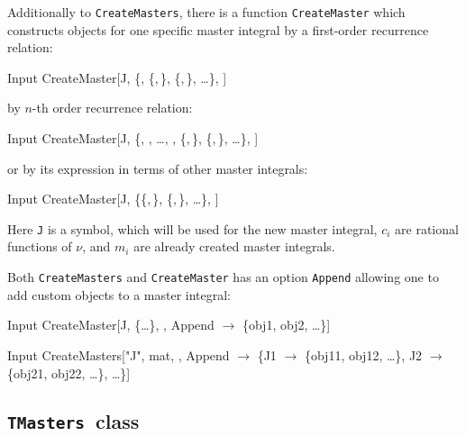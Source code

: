 \documentclass[sort&compress]{elsarticle}
\newcommand{\TMasters}{\texttt{TMasters}}
\begin{document}
Additionally to \texttt{CreateMasters}, there is a function \texttt{CreateMaster} which constructs objects for one specific master integral by a first-order recurrence relation:
\begin{mmaCell}[moredefined={CreateMaster}]{Input}
	CreateMaster[J, \{, \{,\,\}, \{,\,\}, \ldots\}, \mmaUnd{\(\nu\)}]
\end{mmaCell}
by $n$-th order recurrence relation:
\begin{mmaCell}[moredefined={CreateMaster,n}]{Input}
	CreateMaster[J, \{, , \ldots, , \{,\,\}, \{,\,\}, \ldots\}, \mmaUnd{\(\nu\)}]
\end{mmaCell}
or by its expression in terms of other master integrals:
\begin{mmaCell}[moredefined={CreateMaster}]{Input}
	CreateMaster[J, \{\{,\,\}, \{,\,\}, \ldots\}, \mmaUnd{\(\nu\)}]
\end{mmaCell}
Here \texttt{J} is a symbol, which will be used for the new master integral, $c_i$ are rational functions of $\nu$, and $m_i$ are already created master integrals.

Both \texttt{CreateMasters} and \texttt{CreateMaster} has an option \texttt{Append} allowing one to add  custom objects to a master integral:
\begin{mmaCell}[moredefined={CreateMaster}]{Input}
	CreateMaster[J, \{\ldots\}, \mmaUnd{\(\nu\)}, Append \(\to\) \{obj1, obj2, \ldots\}]
\end{mmaCell}
\begin{mmaCell}[moredefined={CreateMasters}]{Input}
	CreateMasters["J", mat, \mmaUnd{\(\nu\)}, Append \(\to\) \{J1 \(\to\) \{obj11, obj12, \ldots\}, 
	                                      J2 \(\to\) \{obj21, obj22, \ldots\}, \ldots\}]
\end{mmaCell}

\subsection{\TMasters\ class}
\end{document}
